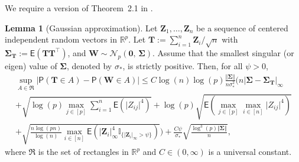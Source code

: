 \documentclass[11pt, a4paper]{article}
\newcommand{\mbf}{\mathbf}
\renewcommand{\l}{\left}
\renewcommand{\r}{\right}
\newcommand{\E}[0]{\mathsf{E}}
\newcommand{\p}{\mathsf{P}}
\theoremstyle{definition}
\theoremstyle{definition}
\theoremstyle{definition}
\newtheorem{lem}[thm]{Lemma}
\theoremstyle{definition}
\theoremstyle{definition}
\theoremstyle{remark}
\theoremstyle{definition}
\theoremstyle{definition}
\theoremstyle{definition}
\begin{document}
We require a version of Theorem~2.1 in \citet{CCK23}.
\begin{lem}[Gaussian approximation]\label{lem:gaussapp}
	Let $\mbf Z_1, \ldots, \mbf Z_n$ be a sequence of centered independent random vectors in $\mathbb R^p$. Let $\mbf T := \sum_{i=1}^n\mbf Z_i/\sqrt{n}$ with $\mbf \Sigma_{\mbf T} := \E (\mbf T\mbf T^\top)$, and $\mbf W \sim \mathcal{N}_p (\mbf 0, \, \mbf \Sigma)$. Assume that the smallest singular (or eigen) value of $\mbf \Sigma$, denoted by $\sigma_*$, is strictly positive. Then, for all $\psi > 0$,
	\begin{multline*}
	\sup_{A \in \mathfrak{R}}\l\vert\p(\mbf T \in A) - \p(\mbf W \in A)\r\vert  \le C\log (n) \log(p) \frac{\Vert\mbf\Sigma\Vert}{n\sigma_*^2} \Biggl(n\vert\mbf\Sigma -\mbf\Sigma_{\mbf T}\vert_{\infty}\\
	+  \sqrt{\log (p)\max_{j \in [p]}\sum_{i = 1}^n \E(\vert Z_{ij}\vert^4)} + \log(p)\sqrt{\E\l(\max_{j \in [p]}\max_{i \in [n]}\vert Z_{ij}\vert^4\r)} \\
	+ \sqrt{\frac{n \log(p n)}{\log (n)}\max_{i \in [n]}\E\l(\vert\mbf Z_i\vert_{\infty}^4 \mathbb{I}_{\{\vert\mbf Z_i\vert_{\infty} > \psi\}}\r)}\Biggr) + \frac{C\psi}{\sigma_*}\sqrt{\frac{\log^3(p)\Vert\mbf\Sigma\Vert}{n}},
	\end{multline*}
	where $\mathfrak{R}$ is the set of rectangles in $\mathbb R^p$ and $C \in (0, \infty)$ is a universal constant. 
\end{lem}
\end{document}
